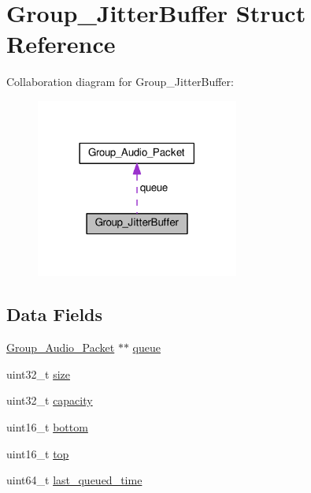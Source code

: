 \hypertarget{struct_group___jitter_buffer}{\section{Group\+\_\+\+Jitter\+Buffer Struct Reference}
\label{struct_group___jitter_buffer}
}


Collaboration diagram for Group\+\_\+\+Jitter\+Buffer\+:
\nopagebreak
\begin{figure}[H]
\begin{center}
\leavevmode
\includegraphics[width=189pt]{d1/d1d/struct_group___jitter_buffer__coll__graph}
\end{center}
\end{figure}
\subsection*{Data Fields}
\begin{DoxyCompactItemize}
\item 
\hyperlink{struct_group___audio___packet}{Group\+\_\+\+Audio\+\_\+\+Packet} $\ast$$\ast$ \hyperlink{struct_group___jitter_buffer_a9829940d971aa22eb04b318876afb018}{queue}
\item 
uint32\+\_\+t \hyperlink{struct_group___jitter_buffer_ab2c6b258f02add8fdf4cfc7c371dd772}{size}
\item 
uint32\+\_\+t \hyperlink{struct_group___jitter_buffer_a391c992c66c3e5540265a85ec2b9216a}{capacity}
\item 
uint16\+\_\+t \hyperlink{struct_group___jitter_buffer_a12c8099ac87952580dd090215e02728c}{bottom}
\item 
uint16\+\_\+t \hyperlink{struct_group___jitter_buffer_a0c235a6df98714bb18538fc0afc5bad1}{top}
\item 
uint64\+\_\+t \hyperlink{struct_group___jitter_buffer_abec0d4ef82ac14ce49e34eff86392f02}{last\+\_\+queued\+\_\+time}
\end{DoxyCompactItemize}


